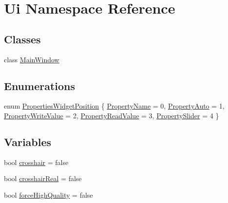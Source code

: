 \hypertarget{namespace_ui}{}\section{Ui Namespace Reference}
\label{namespace_ui}
\subsection*{Classes}
\begin{DoxyCompactItemize}
\item 
class \mbox{\hyperlink{class_ui_1_1_main_window}{Main\+Window}}
\end{DoxyCompactItemize}
\subsection*{Enumerations}
\begin{DoxyCompactItemize}
\item 
enum \mbox{\hyperlink{namespace_ui_a63c7d5e09274c605df66a0251b2db5de}{Properties\+Widget\+Position}} \{ \newline
\mbox{\hyperlink{namespace_ui_a63c7d5e09274c605df66a0251b2db5dea8777cf0aa2c4e679ba1bdf9707dac972}{Property\+Name}} = 0, 
\mbox{\hyperlink{namespace_ui_a63c7d5e09274c605df66a0251b2db5dea8ea0e137ca57c213bb2ff91c6b65f232}{Property\+Auto}} = 1, 
\mbox{\hyperlink{namespace_ui_a63c7d5e09274c605df66a0251b2db5deaf01620e8f4dffdc93a3bdc4d40e661b9}{Property\+Write\+Value}} = 2, 
\mbox{\hyperlink{namespace_ui_a63c7d5e09274c605df66a0251b2db5dea2e479d024139ecda5617df06cd0a3c08}{Property\+Read\+Value}} = 3, 
\newline
\mbox{\hyperlink{namespace_ui_a63c7d5e09274c605df66a0251b2db5deaa29fa9efb61bbe4e5d91d5d57d198260}{Property\+Slider}} = 4
 \}
\end{DoxyCompactItemize}
\subsection*{Variables}
\begin{DoxyCompactItemize}
\item 
bool \mbox{\hyperlink{namespace_ui_abe5a6cd1ec23118ea54cb4a9d8d0bde3}{crosshair}} = false
\item 
bool \mbox{\hyperlink{namespace_ui_ab5be07ff0bbd6f053a2eeeb3148e4531}{crosshair\+Real}} = false
\item 
bool \mbox{\hyperlink{namespace_ui_a9665fd20baaf4665d58dedf7ec1bca54}{force\+High\+Quality}} = false
\end{DoxyCompactItemize}


